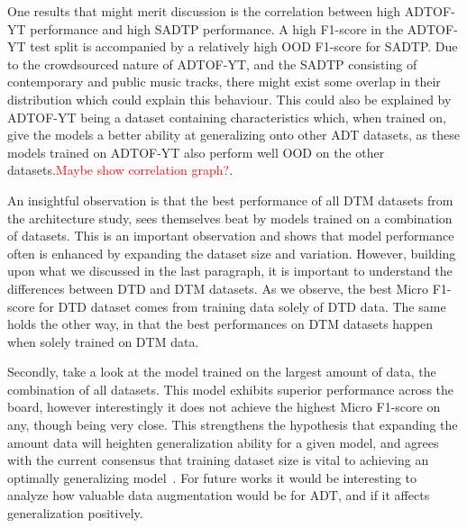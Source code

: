 One results that might merit discussion is the correlation between high ADTOF-YT performance and high SADTP performance. A high F1-score in the ADTOF-YT test split is accompanied by a relatively high \gls{OOD} F1-score for SADTP. Due to the crowdsourced nature of ADTOF-YT, and the SADTP consisting of contemporary and public music tracks, there might exist some overlap in their distribution which could explain this behaviour. This could also be explained by ADTOF-YT being a dataset containing characteristics which, when trained on, give the models a better ability at generalizing onto other \gls{ADT} datasets, as these models trained on ADTOF-YT also perform well \gls{OOD} on the other datasets.\textcolor{red}{Maybe show correlation graph?}.

An insightful observation is that the best performance of all \gls{DTM} datasets from the architecture study, sees themselves beat by models trained on a combination of datasets. This is an important observation and shows that model performance often is enhanced by expanding the dataset size and variation. However, building upon what we discussed in the last paragraph, it is important to understand the differences between \gls{DTD} and \gls{DTM} datasets. As we observe, the best Micro F1-score for \gls{DTD} dataset comes from training data solely of \gls{DTD} data. The same holds the other way, in that the best performances on \gls{DTM} datasets happen when solely trained on \gls{DTM} data.

Secondly, take a look at the model trained on the largest amount of data, the combination of all datasets. This model exhibits superior performance across the board, however interestingly it does not achieve the highest Micro F1-score on any, though being very close. This strengthens the hypothesis that expanding the amount data will heighten generalization ability for a given model, and agrees with the current consensus that training dataset size is vital to achieving an optimally generalizing model~\cite{signals4040042, 9747048}. For future works it would be interesting to analyze how valuable data augmentation would be for \gls{ADT}, and if it affects generalization positively.

